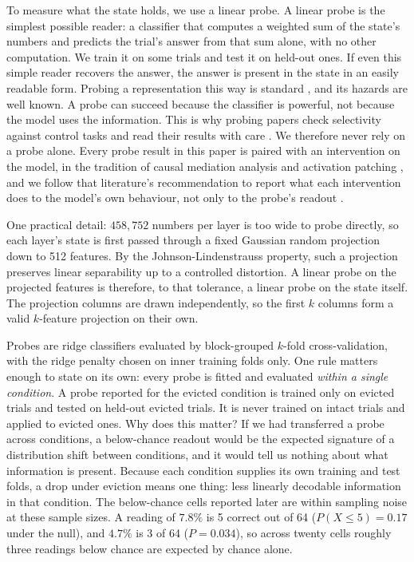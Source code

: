 \documentclass{article}
\begin{document}
To measure what the state holds, we use a linear probe. A linear probe is the
simplest possible reader: a classifier that computes a weighted sum of the
state's numbers and predicts the trial's answer from that sum alone, with no
other computation. We train it on some trials and test it on held-out ones.
If even this simple reader recovers the answer, the answer is present in the
state in an easily readable form. Probing a representation this way is
standard \cite{alain2016probes}, and its hazards are well known. A probe can
succeed because the classifier is powerful, not because the model uses the
information. This is why probing papers check selectivity against control
tasks \cite{hewitt2019control} and read their results with care
\cite{belinkov2022probing}. We therefore never rely on a probe alone. Every
probe result in this paper is paired with an intervention on the model, in the
tradition of causal mediation analysis \cite{vig2020causal} and activation
patching \cite{meng2022rome,wang2022ioi,zhang2024patching}, and we follow that
literature's recommendation to report what each intervention does to the
model's own behaviour, not only to the probe's readout \cite{zhang2024patching}.

One practical detail: $458{,}752$ numbers per layer is too wide to probe
directly, so each layer's state is first passed through a fixed Gaussian random
projection down to 512 features. By the Johnson-Lindenstrauss property, such a
projection preserves linear separability up to a controlled distortion. A
linear probe on the projected features is therefore, to that tolerance, a
linear probe on the state itself. The projection columns are drawn
independently, so the first $k$ columns form a valid $k$-feature projection on
their own.

Probes are ridge classifiers evaluated by block-grouped $k$-fold
cross-validation, with the ridge penalty chosen on inner training folds only.
One rule matters enough to state on its own: every probe is fitted and
evaluated \emph{within a single condition}. A probe reported for the evicted
condition is trained only on evicted trials and tested on held-out evicted
trials. It is never trained on intact trials and applied to evicted ones. Why
does this matter? If we had transferred a probe across conditions, a
below-chance readout would be the expected signature of a distribution shift
between conditions, and it would tell us nothing about what information is
present. Because each condition supplies its own training and test folds, a
drop under eviction means one thing: less linearly decodable information in
that condition. The below-chance cells reported later are within sampling
noise at these sample sizes. A reading of $7.8\%$ is 5 correct out of 64
($P(X \le 5) = 0.17$ under the null), and $4.7\%$ is 3 of 64 ($P = 0.034$), so
across twenty cells roughly three readings below chance are expected by
chance alone.
\end{document}
